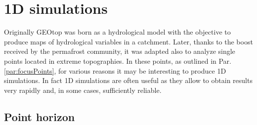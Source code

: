 \section{1D simulations}\label{par:1D3D}

Originally GEOtop was born as a hydrological model with the objective to produce maps of hydrological variables in a catchment. Later, thanks to the boost received by the permafrost community, it was adapted also to analyze single points located in extreme topographies. In these points, as outlined in Par. \ref{par:focusPoints}, for various reasons it may be interesting to produce 1D simulations. In fact 1D simulations are often useful as they allow to obtain results very rapidly and, in some cases, sufficiently reliable. 

\subsection{Point horizon}\label{descr_horizon}

